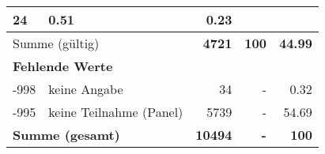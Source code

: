 \begin{longtable}{lXrrr}
       \num{24} &
       \num[round-mode=places,round-precision=2]{0.51} &
         \num[round-mode=places,round-precision=2]{0.23} \\
     \midrule
     \multicolumn{2}{l}{Summe (gültig)} &
       \textbf{\num{4721}} &
     \textbf{\num{100}} &
       \textbf{\num[round-mode=places,round-precision=2]{44.99}} \\
     \multicolumn{5}{l}{\textbf{Fehlende Werte}}\\
       -998 &
       keine Angabe &
         \num{34} &
        - &
         \num[round-mode=places,round-precision=2]{0.32} \\
       -995 &
       keine Teilnahme (Panel) &
         \num{5739} &
        - &
         \num[round-mode=places,round-precision=2]{54.69} \\
     \midrule
     \multicolumn{2}{l}{\textbf{Summe (gesamt)}} &
          \textbf{\num{10494}} &
        \textbf{-} &
        \textbf{\num{100}} \\
     \bottomrule
     \end{longtable}
     
